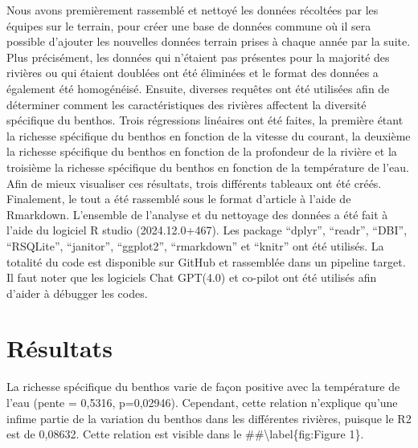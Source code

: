 \documentclass[9pt,twocolumn,twoside,]{pnas-new}
\begin{document}
Nous avons premièrement rassemblé et nettoyé les données récoltées par
les équipes sur le terrain, pour créer une base de données commune où il
sera possible d'ajouter les nouvelles données terrain prises à chaque
année par la suite. Plus précisément, les données qui n'étaient pas
présentes pour la majorité des rivières ou qui étaient doublées ont été
éliminées et le format des données a également été homogénéisé. Ensuite,
diverses requêtes ont été utilisées afin de déterminer comment les
caractéristiques des rivières affectent la diversité spécifique du
benthos. Trois régressions linéaires ont été faites, la première étant
la richesse spécifique du benthos en fonction de la vitesse du courant,
la deuxième la richesse spécifique du benthos en fonction de la
profondeur de la rivière et la troisième la richesse spécifique du
benthos en fonction de la température de l'eau. Afin de mieux visualiser
ces résultats, trois différents tableaux ont été créés. Finalement, le
tout a été rassemblé sous le format d'article à l'aide de Rmarkdown.
L'ensemble de l'analyse et du nettoyage des données a été fait à l'aide
du logiciel R studio (2024.12.0+467). Les package ``dplyr'', ``readr'',
``DBI'', ``RSQLite'', ``janitor'', ``ggplot2'', ``rmarkdown'' et
``knitr'' ont été utilisés. La totalité du code est disponible sur
GitHub et rassemblée dans un pipeline target. Il faut noter que les
logiciels Chat GPT(4.0) et co-pilot ont été utilisés afin d'aider à
débugger les codes.

\section{Résultats}\label{ruxe9sultats}

La richesse spécifique du benthos varie de façon positive avec la
température de l'eau (pente = 0,5316, p=0,02946). Cependant, cette
relation n'explique qu'une infime partie de la variation du benthos dans
les différentes rivières, puisque le R2 est de 0,08632. Cette relation
est visible dans le \#\#\textbackslash label\{fig:Figure 1\}.
\end{document}
